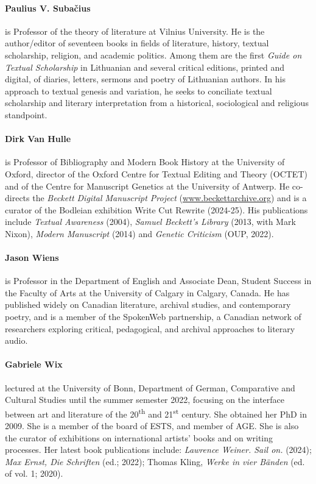 \paragraph{Paulius V. Subačius} is Professor of the theory of literature at Vilnius University. He is the author/editor of seventeen books in fields of literature, history, textual scholarship, religion, and academic politics. Among them are the first \emph{Guide on Textual Scholarship} in Lithuanian and several critical editions, printed and digital, of diaries, letters, sermons and poetry of Lithuanian authors. In his approach to textual genesis and variation, he seeks to conciliate textual scholarship and literary interpretation from a historical, sociological and religious standpoint.

\paragraph{Dirk Van Hulle} is Professor of Bibliography and Modern Book History at the University of Oxford, director of the Oxford Centre for Textual Editing and Theory (OCTET) and of the Centre for Manuscript Genetics at the University of Antwerp. He co-directs the \emph{Beckett Digital Manuscript Project} (\url{www.beckettarchive.org}) and is a curator of the Bodleian exhibition Write Cut Rewrite (2024-25). His publications include \emph{Textual Awareness} (2004), \emph{Samuel Beckett’s Library} (2013, with Mark Nixon), \emph{Modern Manuscript} (2014) and \emph{Genetic Criticism} (OUP, 2022).

\paragraph{Jason Wiens} is Professor in the Department of English and Associate Dean, Student Success in the Faculty of Arts at the University of Calgary in Calgary, Canada. He has published widely on Canadian literature, archival studies, and contemporary poetry, and is a member of the SpokenWeb partnership, a Canadian network of researchers exploring critical, pedagogical, and archival approaches to literary audio.

\paragraph{Gabriele Wix} lectured at the University of Bonn, Department of German, Comparative and Cultural Studies until the summer semester 2022, focusing on the interface between art and literature of the 20\textsuperscript{th} and 21\textsuperscript{st} century. She obtained her PhD in 2009. She is a member of the board of ESTS, and member of AGE. She is also the curator of exhibitions on international artists’ books and on writing processes. Her latest book publications include: \textit{Lawrence Weiner. Sail on.} (2024); \textit{Max Ernst, Die Schriften} (ed.; 2022); Thomas Kling, \textit{Werke in vier Bänden} (ed. of vol. 1; 2020).